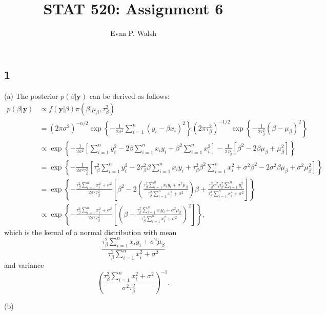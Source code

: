 \documentclass[12pt]{article}
\title{STAT 520: Assignment 6}
\author{Evan P. Walsh}
\begin{document}
\maketitle

\subsection*{1} (a) The posterior $p(\beta|\bm{y})$ can be derived as follows:
\begin{align*}
  p(\beta|\bm{y}) & \propto f(\bm{y}|\beta)\pi(\beta|\mu_{\beta}, \tau_{\beta}^{2}) \\
  & = (2\pi \sigma^{2})^{-n/2}\exp\left\{ -\frac{1}{2\sigma^{2}}\sum_{i=1}^{n}(y_i - \beta x_i)^{2} \right\}(2\pi \tau_{\beta}^{2})^{-1/2}\exp\left\{
  -\frac{1}{2\tau_{\beta}^{2}}(\beta - \mu_{\beta})^{2} \right\} \\
  & \propto\exp\left\{ -\frac{1}{2\sigma^{2}}\left[ \sum_{i=1}^{n}y_i^2 - 2\beta\sum_{i=1}^{n}x_i y_i + \beta^{2}\sum_{i=1}^{n}x_i^2 \right] - 
  \frac{1}{2\tau_{\beta}^{2}}\left[ \beta^{2} - 2\beta \mu_{\beta} + \mu_{\beta}^{2} \right]\right\} \\
  & = \exp\left\{ -\frac{1}{2\sigma^{2}\tau_{\beta}^{2}}\left[ \tau_{\beta}^{2}\sum_{i=1}^{n}y_i^2 - 2\tau_{\beta}^2\beta \sum_{i=1}^{n}x_i y_i + 
    \tau_{\beta}^2\beta^2\sum_{i=1}^{n}x_i^2 + \sigma^2\beta^2 - 2\sigma^2\beta\mu_{\beta} + \sigma^2\mu_{\beta}^2\right] \right\} \\
    & = \exp\left\{ -\frac{\tau_{\beta}^{2}\sum_{i=1}^{n}x_i^2 + \sigma^{2}}{2\sigma^{2}\tau_{\beta}^{2}}\left[ \beta^{2} - 
    2\left( \frac{\tau_{\beta}^2\sum_{i=1}^{n}x_i y_i + \sigma^{2}\mu_{\beta}}{\tau_{\beta}^2\sum_{i=1}^{n}x_i^2 + \sigma^2} \right)\beta + 
\frac{\tau_{\beta}^2\sigma^2\mu_{\beta}^2\sum_{i=1}^n y_i^2}{\tau_{\beta}^2\sum_{i=1}^{n}x_i^2 + \sigma^2}\right] \right\} \\
    & \propto \exp\left\{ -\frac{\tau_{\beta}^{2}\sum_{i=1}^{n}x_i^2 + \sigma^{2}}{2\sigma^{2}\tau_{\beta}^{2}}\left[ \left(\beta - 
    \frac{\tau_{\beta}^2\sum_{i=1}^{n}x_i y_i + \sigma^{2}\mu_{\beta}}{\tau_{\beta}^2\sum_{i=1}^{n}x_i^2 + \sigma^2} \right)^{2}\right] \right\},
\end{align*}
which is the kernal of a normal distribution with mean 
\begin{equation}
  \frac{\tau_{\beta}^2\sum_{i=1}^{n}x_i y_i + \sigma^{2}\mu_{\beta}}{\tau_{\beta}^2\sum_{i=1}^{n}x_i^2 + \sigma^2}
  \label{1.1}
\end{equation}
and variance
\begin{equation}
  \left(\frac{\tau_{\beta}^{2}\sum_{i=1}^{n}x_i^2 + \sigma^{2}}{\sigma^{2}\tau_{\beta}^{2}}\right)^{-1}.
  \label{1.2}
\end{equation}

(b) 
\end{document}
